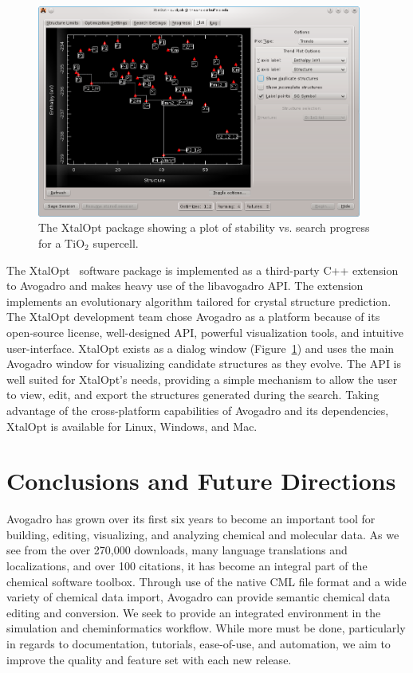\documentclass[10pt]{bmc_article}
\newenvironment{bmcformat}{\begin{raggedright}
\baselineskip20pt\sloppy\setboolean{publ}{false}}{\end{raggedright}
\baselineskip20pt\sloppy}
\begin{document}
\begin{bmcformat}
\begin{figure}
  \includegraphics[width=0.95\textwidth]{images/xtalopt}
  \caption{The XtalOpt package showing a plot of stability vs. search progress
    for a $\mathrm{TiO_2}$ supercell.}
  \label{f:xtalopt}
\end{figure}

The XtalOpt~\cite{xo1, xo2} software package is implemented as a third-party C++
extension to Avogadro and makes heavy use of the libavogadro API. The extension
implements an evolutionary algorithm tailored for crystal structure prediction.
The XtalOpt development team chose Avogadro as a platform because of its
open-source license, well-designed API, powerful visualization tools, and
intuitive user-interface. XtalOpt exists as a dialog window
(Figure~\ref{f:xtalopt}) and uses the main Avogadro window for visualizing
candidate structures as they evolve. The API is well suited for XtalOpt’s needs,
providing a simple mechanism to allow the user to view, edit, and export the
structures generated during the search. Taking advantage of the cross-platform
capabilities of Avogadro and its dependencies, XtalOpt is available for Linux,
Windows, and Mac.

\section{Conclusions and Future Directions}

Avogadro has grown over its first six years to become an important
tool for building, editing, visualizing, and analyzing chemical and
molecular data. As we see from the over 270,000 downloads, many
language translations and localizations, and over 100 citations, it
has become an integral part of the chemical software toolbox. Through
use of the native CML file format and a wide variety of chemical data
import, Avogadro can provide semantic chemical data editing and conversion.
We seek to provide an integrated environment in the simulation and
cheminformatics workflow. While more must be done, particularly in
regards to documentation, tutorials, ease-of-use, and automation, we
aim to improve the quality and feature set with each new release.


\end{bmcformat}
\end{document}

